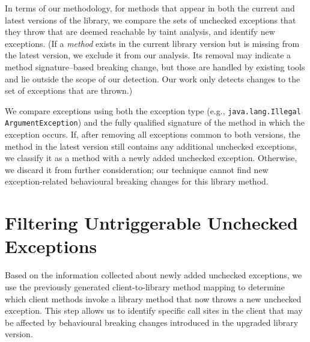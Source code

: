 

In terms of our methodology, for methods that appear in both the current and latest versions of the library, we compare the sets of unchecked exceptions that they throw that are deemed reachable by taint analysis, and identify new exceptions. (If a \emph{method} exists in the current library version but is missing from the latest version, we exclude it from our analysis. Its removal may indicate a method signature–based breaking change, but those are handled by existing tools and lie outside the scope of our detection. Our work only detects changes to the set of exceptions that are thrown.)

We compare exceptions using both the exception type (e.g., \texttt{java.lang.Illegal\\ArgumentException}) and the fully qualified signature of the method in which the exception occurs. If, after removing all exceptions common to both versions, the method in the latest version still contains any additional unchecked exceptions, we classify it as a method with a newly added unchecked exception. Otherwise, we discard it from further consideration; our technique cannot find new exception-related behavioural breaking changes for this library method.

\section{Filtering Untriggerable Unchecked Exceptions}

Based on the information collected about newly added unchecked exceptions, we use the previously generated client-to-library method mapping to determine which client methods invoke a library method that now throws a new unchecked exception. This step allows us to identify specific call sites in the client that may be affected by behavioural breaking changes introduced in the upgraded library version.

